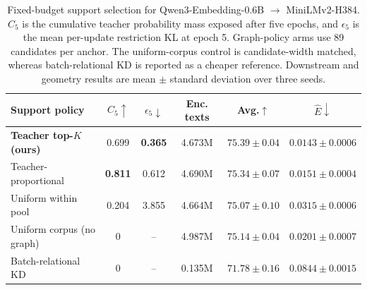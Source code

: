 \begin{table}[t]
\centering
\caption{Fixed-budget support selection for Qwen3-Embedding-0.6B $\rightarrow$
MiniLMv2-H384. $C_5$ is the cumulative teacher probability mass exposed after
five epochs, and $\epsilon_5$ is the mean per-update restriction KL at epoch 5.
Graph-policy arms use 89 candidates per anchor. The uniform-corpus control is
candidate-width matched, whereas batch-relational KD is reported as a cheaper
reference. Downstream and geometry results are mean $\pm$ standard deviation
over three seeds.}
\label{tab:support_ablation}
\small
\setlength{\tabcolsep}{4.0pt}
\begin{tabular}{lccccc}
\toprule
Support policy & $C_5\uparrow$ & $\epsilon_5\downarrow$ & Enc. texts
& Avg.$\uparrow$ & $\hat{E}\downarrow$ \\
\midrule
\textbf{Teacher top-$K$ (ours)}
& 0.699 & \textbf{0.365} & 4.673M
& $\mathbf{75.39 \pm 0.04}$ & $\mathbf{0.0143 \pm 0.0006}$ \\
Teacher-proportional
& \textbf{0.811} & 0.612 & 4.690M
& $75.34 \pm 0.07$ & $0.0151 \pm 0.0004$ \\
Uniform within pool
& 0.204 & 3.855 & 4.664M
& $75.07 \pm 0.10$ & $0.0315 \pm 0.0006$ \\
Uniform corpus (no graph)
& 0 & -- & 4.987M
& $75.14 \pm 0.04$ & $0.0201 \pm 0.0007$ \\
Batch-relational KD
& 0 & -- & 0.135M
& $71.78 \pm 0.16$ & $0.0844 \pm 0.0015$ \\
\bottomrule
\end{tabular}
\end{table}
